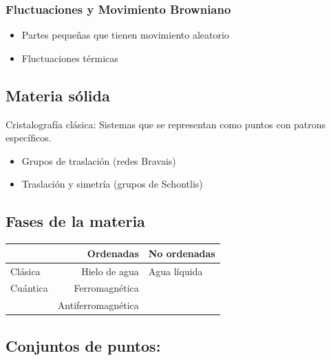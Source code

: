 \subsubsection*{Fluctuaciones y Movimiento Browniano}

\begin{itemize}
    \item Partes pequeñas que tienen movimiento aleatorio
    \item Fluctuaciones térmicas
\end{itemize}

\subsection{Materia sólida} 

Cristalografía clásica: Sistemas que se representan como puntos con patrons específicos.
\begin{itemize}
    \item Grupos de traslación (redes Bravais)
    \item Traslación y simetría (grupos de Schontlis)
\end{itemize}


\subsection{Fases de la materia}

\begin{tabular*}{0.8\textwidth}{l|rl}
             & Ordenadas & No ordenadas\\
             \hline
     Clásica & Hielo de agua & Agua líquida\\
     Cuántica & Ferromagnética\\
                & Antiferromagnética\\
\end{tabular*}

\subsection{Conjuntos de puntos:}

